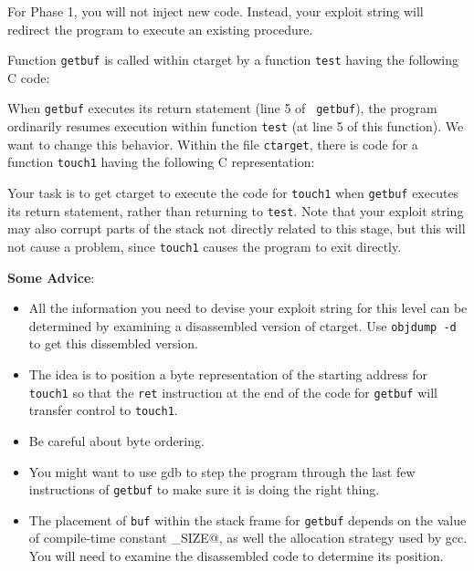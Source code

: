 \documentclass[11pt]{article}
\newenvironment{ccode}%
{\small}%
{}
\begin{document}
For Phase 1, you will not inject new code.
Instead, your exploit string will redirect the program to execute 
an existing procedure.

Function {\tt getbuf} is called within {\sc ctarget} by a function
{\tt test} having the following C code:

\begin{ccode}

\end{ccode}

When {\tt getbuf} executes its return statement (line 5 of {\tt
getbuf}), the program ordinarily resumes execution within function
{\tt test} (at line 5 of this function).
We want to change this behavior.
Within the file {\tt ctarget}, there is code for a function {\tt touch1} having
the following C representation:

\begin{ccode}

\end{ccode}

Your task is to get {\sc ctarget} to execute the code for {\tt touch1}
when {\tt getbuf} executes its return statement, rather than returning
to {\tt test}.  Note that your exploit string may also corrupt parts
of the stack not directly related to this stage, but this will not
cause a problem, since {\tt touch1} causes the program to exit
directly.

{\bf Some Advice}:
\begin{itemize}

\item All the information you need to devise your exploit string for
this level can be determined by examining a disassembled version of
{\sc ctarget}. Use {\tt objdump -d} to get this dissembled version.

\item
The idea is to position a byte representation of the starting address
for {\tt touch1} so that the {\tt ret} instruction at the end of the
code for {\tt getbuf} will transfer control to {\tt touch1}.

\item
Be careful about byte ordering.  

\item
You might want to use {\sc gdb} to step the program through the last
few instructions of {\tt getbuf} to make sure it is doing the right
thing.

\item
The placement of {\tt buf} within the stack frame for {\tt getbuf}
depends on the value of compile-time constant \verb@BUFFER_SIZE@, as
well the allocation strategy used by {\sc gcc}.
You will need to examine the disassembled code to determine its position.
\end{itemize}
\end{document}
